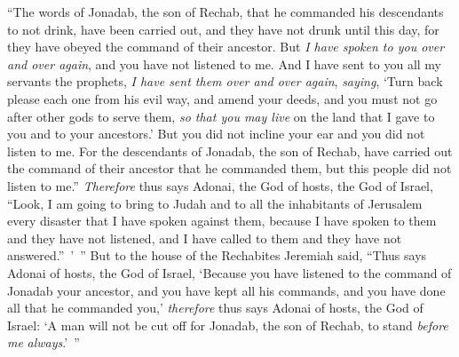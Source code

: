 \begin{biblechapter}
\verse “The words of Jonadab, the son of Rechab, that he commanded his descendants to not drink, have been carried out, and they have not drunk until this day, for they have obeyed the command of their ancestor. But \textit{I have spoken to you over and over again}, and you have not listened to me.
\verse And I have sent to you all my servants the prophets, \textit{I have sent them over and over again}, \textit{saying}, ‘Turn back please each one from his evil way, and amend your deeds, and you must not go after other gods to serve them, \textit{so that you may live} on the land that I gave to you and to your ancestors.’ But you did not incline your ear and you did not listen to me.
\verse For the descendants of Jonadab, the son of Rechab, have carried out the command of their ancestor that he commanded them, but this people did not listen to me.”
\verse \textit{Therefore} thus says Adonai, the God of hosts, the God of Israel, “Look, I am going to bring to Judah and to all the inhabitants of Jerusalem every disaster that I have spoken against them, because I have spoken to them and they have not listened, and I have called to them and they have not answered.” ’ ”
\verse But to the house of the Rechabites Jeremiah said, “Thus says Adonai of hosts, the God of Israel, ‘Because you have listened to the command of Jonadab your ancestor, and you have kept all his commands, and you have done all that he commanded you,’
\verse \textit{therefore} thus says Adonai of hosts, the God of Israel: ‘A man will not be cut off for Jonadab, the son of Rechab, to stand \textit{before me} \textit{always}.’ ”
\end{biblechapter}

